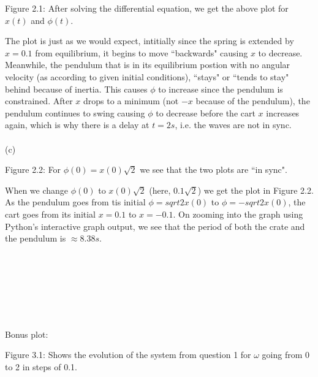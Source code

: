 \documentclass[11pt]{article}
\begin{document}
\begin{enumerate}
\begin{changemargin}{3cm}{3cm}  
  Figure 2.1: After solving the differential equation, we get the above plot for $x(t)$ and $\phi(t)$.
\end{changemargin}

The plot is just as we would expect, intitially since the spring is extended by $x = 0.1$ from equilibrium, it begins to move ``backwards" causing $x$ to decrease. Meanwhile, the pendulum that is in its equilibrium postion with no angular velocity (as according to given initial conditions), ``stays" or ``tends to stay" behind because of inertia. This causes $\phi$ to increase since the pendulum is constrained. After $x$ drops to a minimum (not $-x$ because of the pendulum), the pendulum continues to swing causing $\phi$ to decrease before the cart $x$ increases again, which is why there is a delay at $t = 2s$, i.e. the waves are not in sync.
\\ \\
(c)
\begin{center}
\end{center}

\begin{changemargin}{3cm}{3cm}  
  Figure 2.2: For $\phi(0) = x(0)\sqrt{2}$ we see that the two plots are ``in sync".
\end{changemargin}

When we change $\phi(0)$ to $x(0)\sqrt{2}$ (here, $0.1\sqrt{2}$) we get the plot in Figure 2.2. As the pendulum goes from tis initial $\phi = sqrt{2}x(0)$ to $\phi = -sqrt{2}x(0)$, the cart goes from its initial $x = 0.1$ to $x = -0.1$. On zooming into the graph using Python's interactive graph output, we see that the period of both the crate and the pendulum is $\approx 8.38s$.
\\ \\
\\ \\
\\ \\
\\ \\
Bonus plot:

\begin{center}
\end{center}

\begin{changemargin}{3cm}{3cm}  
  Figure 3.1: Shows the evolution of the system from question 1 for $\omega$ going from 0 to 2 in steps of 0.1.
\end{changemargin}

\end{enumerate}
\end{document}
